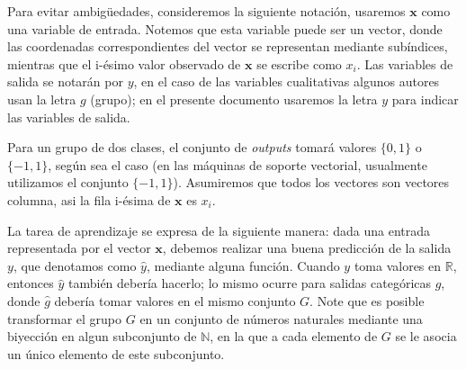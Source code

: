 \documentclass[letterpaper,12pt,oneside]{book}
\begin{document}
{Para evitar ambigüedades, consideremos la siguiente notación, usaremos $\textbf{x}$ como una variable de entrada. Notemos que esta variable puede ser un vector, donde las coordenadas correspondientes del vector se representan mediante subíndices, mientras que el i-ésimo valor observado de $\textbf{x}$ se escribe como $x_i$. Las variables de salida  se notarán por $y$, en el caso de las variables cualitativas algunos autores usan la letra $g$ (grupo); en el presente documento usaremos la letra $y$ para indicar las variables de salida.

Para un grupo de dos clases, el conjunto de \textit{outputs} tomará valores $\{0, 1\}$ o $\{-1, 1\}$, según sea el caso (en las máquinas de soporte vectorial, usualmente utilizamos el conjunto $\{-1, 1\}$). Asumiremos que todos los vectores son vectores columna, asi la fila i-ésima de $\textbf{x}$ es $x_i$.

La tarea de aprendizaje se expresa de la siguiente manera: dada una entrada representada por el vector $\textbf{x}$, debemos realizar una buena predicción de la salida $y$, que denotamos como $\hat{y}$, mediante alguna función. Cuando $y$ toma valores en $\mathbb{R}$, entonces $\hat{y}$ también debería hacerlo; lo mismo ocurre para salidas categóricas $g$, donde $\hat{g}$ debería tomar valores en el mismo conjunto $G$. Note que es posible transformar el grupo $G$ en un conjunto de números naturales mediante una biyección en algun subconjunto de $\mathbb{N}$, en la que a cada elemento de $G$ se le asocia un único elemento de este subconjunto.
}




	
\end{document}
